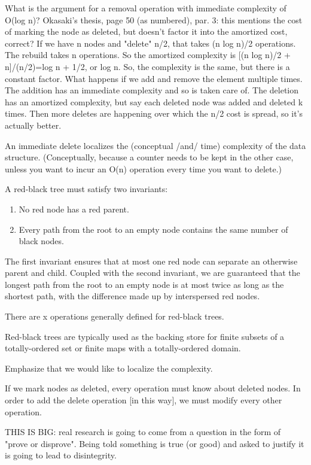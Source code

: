 \documentclass[preprint]{sigplanconf}
\begin{document}
What is the argument for a removal operation with immediate complexity of O(log n)?
Okasaki's thesis, page 50 (as numbered), par. 3: this mentions the cost of marking the node as deleted, but doesn't factor it into the amortized cost, correct? If we have n nodes and "delete" n/2, that takes (n log n)/2 operations. The rebuild takes n operations. So the amortized complexity is [(n log n)/2 + n]/(n/2)=log n + 1/2, or log n. So, the complexity is the same, but there is a constant factor. What happens if we add and remove the element multiple times. The addition has an immediate complexity and so is taken care of. The deletion has an amortized complexity, but say each deleted node was added and deleted k times. Then more deletes are happening over which the n/2 cost is spread, so it's actually better.

An immediate delete localizes the (conceptual /and/ time) complexity of the data structure. (Conceptually, because a counter needs to be kept in the other case, unless you want to incur an O(n) operation every time you want to delete.)

A red-black tree must satisfy two invariants:

\begin{enumerate}
\item No red node has a red parent.
\item Every path from the root to an empty node contains the same number of black nodes.
\end{enumerate}

The first invariant ensures that at most one red node can separate an otherwise parent and child. Coupled with the second invariant, we are guaranteed that the longest path from the root to an empty node is at most twice as long as the shortest path, with the difference made up by interspersed red nodes.

There are x operations generally defined for red-black trees.

Red-black trees are typically used as the backing store for finite subsets of 
a totally-ordered set or finite maps with a totally-ordered domain.

Emphasize that we would like to localize the complexity.

If we mark nodes as deleted, every operation must know about deleted nodes.
In order to add the delete operation [in this way], we must modify every 
other operation.

THIS IS BIG: real research is going to come from a question in the form of
"prove or disprove". Being told something is true (or good) and asked to 
justify it is going to lead to disintegrity.
\end{document}
